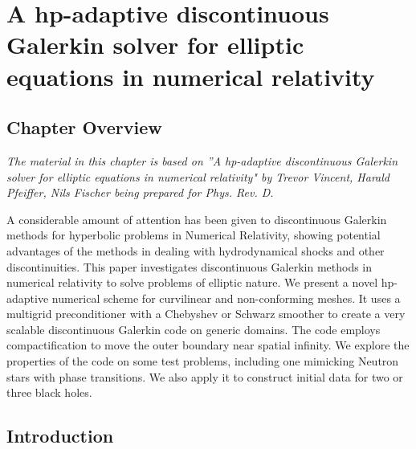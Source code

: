 \chapter{A hp-adaptive discontinuous Galerkin solver for elliptic equations in numerical relativity}

\section{Chapter Overview}

\textit{The material in this chapter is based on ”A hp-adaptive discontinuous Galerkin solver for elliptic equations in numerical relativity" by Trevor Vincent, Harald Pfeiffer, Nils Fischer being prepared for Phys. Rev. D.}

A considerable amount of attention has been given to discontinuous
Galerkin methods for hyperbolic problems in Numerical Relativity,
showing potential advantages of the methods in dealing with
hydrodynamical shocks and other discontinuities.
This paper investigates discontinuous Galerkin
methods in numerical relativity to solve problems of elliptic
nature.  We present a novel hp-adaptive numerical
scheme for curvilinear and non-conforming meshes.  It uses a multigrid
preconditioner with a Chebyshev or Schwarz smoother to create a very scalable discontinuous Galerkin code
on generic domains.  The code employs compactification
  to move the outer boundary near spatial infinity.
We explore the properties of the code on some test
problems, including one mimicking Neutron stars with phase transitions.
  We also apply it to construct initial data for two or three black holes.
\section{Introduction}



